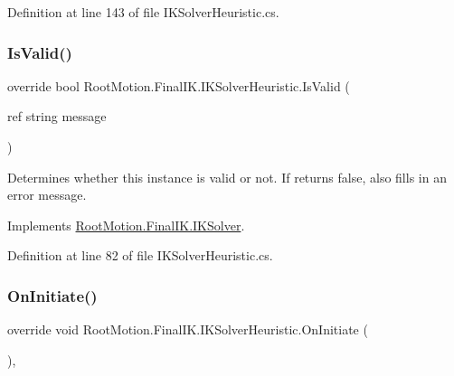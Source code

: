 Definition at line 143 of file I\+K\+Solver\+Heuristic.\+cs.

\mbox{\label{class_root_motion_1_1_final_i_k_1_1_i_k_solver_heuristic_a81daa8bcbfe7cf858f2e439de4ade437}} 
\subsubsection{\texorpdfstring{Is\+Valid()}{IsValid()}}
{\footnotesize\ttfamily override bool Root\+Motion.\+Final\+I\+K.\+I\+K\+Solver\+Heuristic.\+Is\+Valid (\begin{DoxyParamCaption}\item[{ref string}]{message }\end{DoxyParamCaption})\hspace{0.3cm}{\ttfamily [virtual]}}



Determines whether this instance is valid or not. If returns false, also fills in an error message. 



Implements \mbox{\hyperlink{class_root_motion_1_1_final_i_k_1_1_i_k_solver_a6ccc7496e7f4e95668e1c1bdaa051d67}{Root\+Motion.\+Final\+I\+K.\+I\+K\+Solver}}.



Definition at line 82 of file I\+K\+Solver\+Heuristic.\+cs.

\mbox{\label{class_root_motion_1_1_final_i_k_1_1_i_k_solver_heuristic_a665700645200f3960f186bb6d3835691}} 
\subsubsection{\texorpdfstring{On\+Initiate()}{OnInitiate()}}
{\footnotesize\ttfamily override void Root\+Motion.\+Final\+I\+K.\+I\+K\+Solver\+Heuristic.\+On\+Initiate (\begin{DoxyParamCaption}{ }\end{DoxyParamCaption})\hspace{0.3cm}{\ttfamily [protected]}, {\ttfamily [virtual]}}



